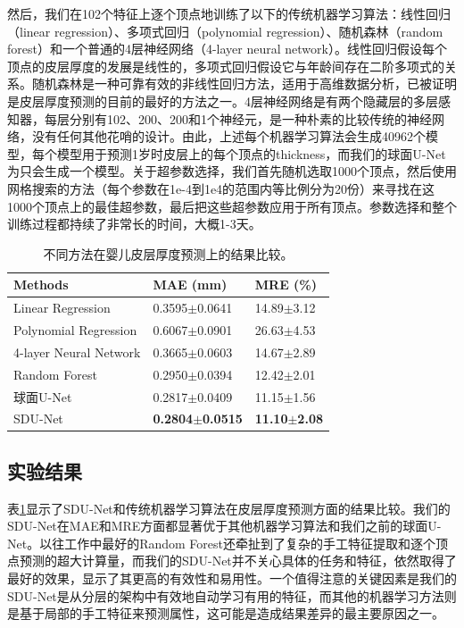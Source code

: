 然后，我们在102个特征上逐个顶点地训练了以下的传统机器学习算法：线性回归（linear regression）、多项式回归（polynomial regression）、随机森林（random forest）和一个普通的4层神经网络（4-layer neural network）。线性回归假设每个顶点的皮层厚度的发展是线性的，多项式回归假设它与年龄间存在二阶多项式的关系。随机森林是一种可靠有效的非线性回归方法，适用于高维数据分析，已被证明是皮层厚度预测的目前的最好的方法之一\cite{meng2017can}。4层神经网络是有两个隐藏层的多层感知器，每层分别有102、200、200和1个神经元，是一种朴素的比较传统的神经网络，没有任何其他花哨的设计。由此，上述每个机器学习算法会生成40962个模型，每个模型用于预测1岁时皮层上的每个顶点的thickness，而我们的球面U-Net为只会生成一个模型。关于超参数选择，我们首先随机选取1000个顶点，然后使用网格搜索的方法（每个参数在1e-4到1e4的范围内等比例分为20份）来寻找在这1000个顶点上的最佳超参数，最后把这些超参数应用于所有顶点。参数选择和整个训练过程都持续了非常长的时间，大概1-3天。

\begin{table}[t]
		\caption{不同方法在婴儿皮层厚度预测上的结果比较。}
		\label{tab:皮层厚度预测的结果}
		\centering
		\begin{tabularx}{0.8\linewidth}{l|X<{\centering}|X<{\centering}}
			\hline
			Methods                                                &              MAE (mm)          &  MRE (\%)  \\
			\hline   
			Linear Regression                                      &       0.3595$\pm$0.0641        & 14.89$\pm$3.12 \\
			Polynomial Regression                                  &     0.6067$\pm$0.0901          & 26.63$\pm$4.53\\
			4-layer Neural Network                                 &    0.3665$\pm$0.0603           & 14.67$\pm$2.89\\
			Random Forest \cite{meng2017can}                     &    0.2950$\pm$0.0394           &  12.42$\pm$2.01 \\
			球面U-Net \cite{zhao2019spherical_ipmi}        &    0.2817$\pm$0.0409           &   11.15$\pm$1.56  \\
			SDU-Net                                                &   \textbf{0.2804$\pm$0.0515}   &  \textbf{11.10$\pm$2.08}  \\
			\hline
		\end{tabularx}
\end{table}

\subsection{实验结果}
表\ref{tab:皮层厚度预测的结果}显示了SDU-Net和传统机器学习算法在皮层厚度预测方面的结果比较。我们的SDU-Net在MAE和MRE方面都显著优于其他机器学习算法和我们之前的球面U-Net。以往工作中最好的Random Forest还牵扯到了复杂的手工特征提取和逐个顶点预测的超大计算量，而我们的SDU-Net并不关心具体的任务和特征，依然取得了最好的效果，显示了其更高的有效性和易用性。一个值得注意的关键因素是我们的SDU-Net是从分层的架构中有效地自动学习有用的特征，而其他的机器学习方法则是基于局部的手工特征来预测属性，这可能是造成结果差异的最主要原因之一。

